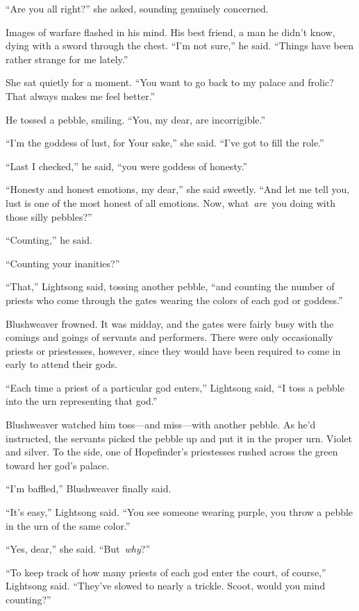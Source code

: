 “Are you all right?” she asked, sounding genuinely concerned.

Images of warfare flashed in his mind. His best friend, a man he didn’t know, dying with a sword through the chest. “I’m not sure,” he said. “Things have been rather strange for me lately.”

She sat quietly for a moment. “You want to go back to my palace and frolic? That always makes me feel better.”

He tossed a pebble, smiling. “You, my dear, are incorrigible.”

“I’m the goddess of lust, for Your sake,” she said. “I’ve got to fill the role.”

“Last I checked,” he said, “you were goddess of honesty.”

“Honesty and honest emotions, my dear,” she said sweetly. “And let me tell you, lust is one of the most honest of all emotions. Now, what~\textit{are}~you doing with those silly pebbles?”

“Counting,” he said.

“Counting your inanities?”

“That,” Lightsong said, tossing another pebble, “and counting the number of priests who come through the gates wearing the colors of each god or goddess.”

Blushweaver frowned. It was midday, and the gates were fairly busy with the comings and goings of servants and performers. There were only occasionally priests or priestesses, however, since they would have been required to come in early to attend their gods.

“Each time a priest of a particular god enters,” Lightsong said, “I toss a pebble into the urn representing that god.”

Blushweaver watched him toss—and miss—with another pebble. As he’d instructed, the servants picked the pebble up and put it in the proper urn. Violet and silver. To the side, one of Hopefinder’s priestesses rushed across the green toward her god’s palace.

“I’m baffled,” Blushweaver finally said.

“It’s easy,” Lightsong said. “You see someone wearing purple, you throw a pebble in the urn of the same color.”

“Yes, dear,” she said. “But~\textit{why}?”

“To keep track of how many priests of each god enter the court, of course,” Lightsong said. “They’ve slowed to nearly a trickle. Scoot, would you mind counting?”


